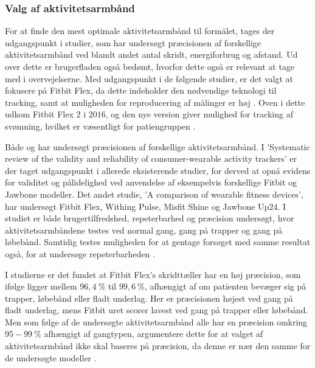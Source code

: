 \subsubsection{Valg af aktivitetsarmbånd}

For at finde den mest optimale aktivitetsarmbånd til formålet, tages der udgangspunkt i studier, som har undersøgt præcisionen af forskellige aktivitetsarmbånd ved blandt andet antal skridt, energiforbrug og afstand. Ud over dette er brugerfladen også bedømt, hvorfor dette også er relevant at tage med i overvejelserne. Med udgangspunkt i de følgende studier, er det valgt at fokusere på Fitbit Flex, da dette indeholder den nødvendige teknologi til tracking, samt at muligheden for reproducering af målinger er høj \citep{kaewkannate2016}. Oven i dette udkom Fitbit Flex $2$ i $2016$, og den nye version giver mulighed for tracking af svømning, hvilket er væsentligt for patiengruppen \citep{fitbitflex}.

Både \citep{evenson2015} og \citep{kaewkannate2016} har undersøgt præcisionen af forskellige aktivitetsarmbånd. I 'Systematic review of the validity and reliability of consumer-wearable activity trackers' er der taget udgangspunkt i allerede eksisterende studier, for derved at opnå evidens for validitet og pålidelighed ved anvendelse af eksempelvis forskellige Fitbit og Jawbone modeller. Det andet studie, 'A comparison of wearable fitness devices', har undersøgt Fitbit Flex, Withing Pulse, Misfit Shine og Jawbone Up$24$. I studiet er både brugertilfredshed, repeterbarhed og præcision undersøgt, hvor aktivitetsarmbåndene testes ved normal gang, gang på trapper og gang på løbebånd. Samtidig testes muligheden for at gentage forsøget med samme resultat også, for at undersøge repeterbarheden \citep{evenson2015, kaewkannate2016}.

I studierne er det fundet at Fitbit Flex's skridttæller har en høj præcision, som ifølge \citep{kaewkannate2016} ligger mellem $96,4~\%$ til $99,6~\%$, afhængigt af om patienten bevæger sig på trapper, løbebånd eller fladt underlag. Her er præcisionen højest ved gang på fladt underlag, mens Fitbit uret scorer lavest ved gang på trapper eller løbebånd. Men som følge af de undersøgte aktivitetsarmbånd alle har en præcision omkring $95-99~\%$ afhængigt af gangtypen, argumentere dette for at valget af aktivitetsarmbånd ikke skal baseres på præcision, da denne er nær den samme for de undersøgte modeller \citep{kaewkannate2016}.

